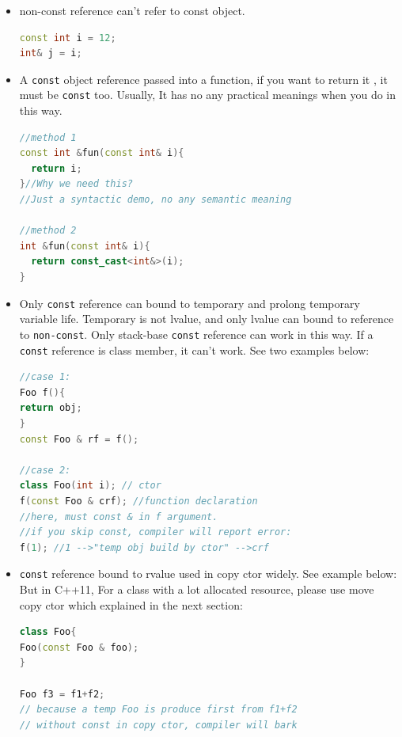 \documentclass[a4paper,12pt,twoside]{book}
\begin{document}
\begin{itemize}
\item non-const reference can't refer to const object.
\begin{lstlisting}[frame=single, language=c++]
const int i = 12;
int& j = i;
\end{lstlisting}

\item A \texttt{const} object reference passed into a function, if you want to return it , it must be \texttt{const} too. Usually, It has no any practical meanings when you do in this way. 
\begin{lstlisting}[frame=single, language=c++]
//method 1
const int &fun(const int& i){
  return i;
}//Why we need this?
//Just a syntactic demo, no any semantic meaning

//method 2
int &fun(const int& i){
  return const_cast<int&>(i);
}
\end{lstlisting}

\item Only \texttt{const} reference can bound to temporary and prolong temporary variable life. Temporary is not lvalue, and only lvalue can bound to reference to \texttt{non-const}. Only stack-base \texttt{const} reference can work in this way. If a \texttt{const} reference is class member, it can't work.  See two examples below:
\begin{lstlisting}[frame=single, language=c++]
//case 1:
Foo f(){
return obj;
}
const Foo & rf = f();

//case 2:
class Foo(int i); // ctor
f(const Foo & crf); //function declaration
//here, must const & in f argument.
//if you skip const, compiler will report error:
f(1); //1 -->"temp obj build by ctor" -->crf
\end{lstlisting}

\item \texttt{const} reference bound to rvalue used in copy ctor widely. See example below: But in C++11, For a class with a lot allocated resource, please use move copy ctor which explained in the next section:

\begin{lstlisting}[frame=single, language=c++]
class Foo{
Foo(const Foo & foo);
}

Foo f3 = f1+f2;
// because a temp Foo is produce first from f1+f2
// without const in copy ctor, compiler will bark
\end{lstlisting}
\end{itemize}
\end{document}

